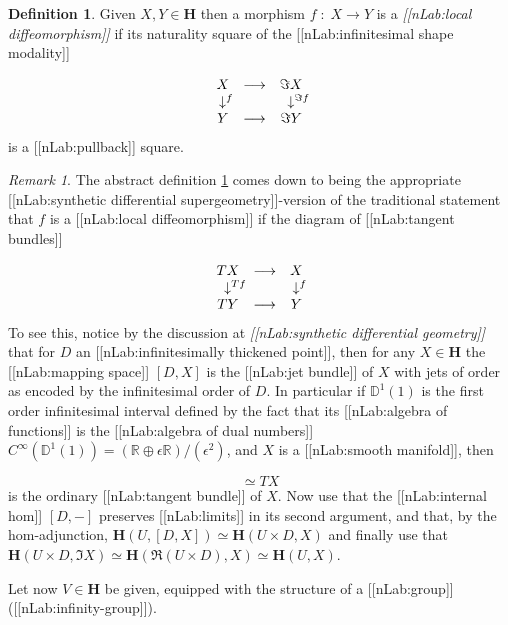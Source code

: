 \documentclass[12pt,titlepage]{article}
\def\mathrlap{\mathpalette\mathrlapinternal}
\def\mathrlapinternal#1#2{\rlap{$\mathsurround=0pt#1{#2}$}}
\newcommand{\itexarray}[1]{\begin{matrix}#1\end{matrix}}
\theoremstyle{plain}
\theoremstyle{definition}
\newtheorem{defn}{Definition}
\theoremstyle{remark}
\newtheorem{remark}{Remark}
\begin{document}
\begin{defn}
\label{LocalDiffeomorphisms}\hypertarget{LocalDiffeomorphisms}{}
Given $X,Y\in \mathbf{H}$ then a morphism $f \;\colon\; X\longrightarrow Y$ is a \emph{[[nLab:local diffeomorphism]]} if its naturality square of the [[nLab:infinitesimal shape modality]]

\begin{displaymath}
\itexarray{
    X &\longrightarrow& \Im X
    \\
    \downarrow^{\mathrlap{f}} && \downarrow^{\mathrlap{\Im f}}
    \\
    Y &\longrightarrow& \Im Y
  }
\end{displaymath}
is a [[nLab:pullback]] square.

\end{defn}
\begin{remark}
\label{}\hypertarget{}{}
The abstract definition \ref{LocalDiffeomorphisms} comes down to being the appropriate [[nLab:synthetic differential supergeometry]]-version of the traditional statement that $f$ is a [[nLab:local diffeomorphism]] if the diagram of [[nLab:tangent bundles]]

\begin{displaymath}
\itexarray{
    T X &\longrightarrow& X
    \\
    \downarrow^{\mathrlap{T f}} && \downarrow^{\mathrlap{f}}
    \\
    T Y &\longrightarrow& Y
  }
\end{displaymath}
To see this, notice by the discussion at \emph{[[nLab:synthetic differential geometry]]} that for $D$ an [[nLab:infinitesimally thickened point]], then for any $X \in \mathbf{H}$ the [[nLab:mapping space]] $[D,X]$ is the [[nLab:jet bundle]] of $X$ with jets of order as encoded by the infinitesimal order of $D$. In particular if $\mathbb{D}^1(1)$ is the first order infinitesimal interval defined by the fact that its [[nLab:algebra of functions]] is the [[nLab:algebra of dual numbers]] $C^\infty(\mathbb{D}^1(1)) = (\mathbb{R} \oplus \epsilon \mathbb{R})/(\epsilon^2)$, and $X$ is a [[nLab:smooth manifold]], then

\begin{displaymath}
[\mathbb{D}^1(1), X]\simeq T X
\end{displaymath}
is the ordinary [[nLab:tangent bundle]] of $X$. Now use that the [[nLab:internal hom]] $[D,-]$ preserves [[nLab:limits]] in its second argument, and that, by the hom-adjunction, $\mathbf{H}(U, [D,X]) \simeq \mathbf{H}(U \times D, X)$ and finally use that $\mathbf{H}(U \times D, \Im X)\simeq \mathbf{H}(\Re(U \times D), X)\simeq \mathbf{H}(U,X)$.

\end{remark}
Let now $V \in \mathbf{H}$ be given, equipped with the structure of a [[nLab:group]] ([[nLab:infinity-group]]).
\end{document}
